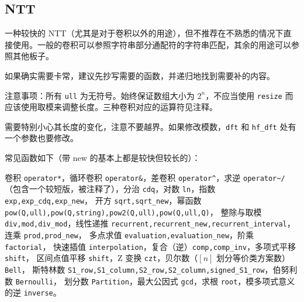 \documentclass[12pt]{ctexart}
\begin{document}
\subsection{NTT}

一种较快的 NTT（尤其是对于卷积以外的用途），但不推荐在不熟悉的情况下直接使用。一般的卷积可以参照字符串部分通配符的字符串匹配，其余的用途可以参照其他板子。

如果确实需要卡常，建议先抄写需要的函数，并递归地找到需要补的内容。

注意事项：所有 \verb|ull| 为无符号。始终保证数组大小为 $2^n$，不应当使用 \verb|resize| 而应该使用取模来调整长度。三种卷积对应的运算符见注释。

需要特别小心其长度的变化，注意不要越界。如果修改模数，\verb|dft| 和 \verb|hf_dft| 处有一个参数也要修改。

常见函数如下（带 new 的基本上都是较快但较长的）：

卷积 \verb|operator*|，循环卷积 \verb|operator&|，差卷积 \verb|operator^|，求逆 \verb|operator~/|
（包含一个较短版，被注释了），分治 \verb|cdq|，对数 \verb|ln|，指数 \verb|exp,exp_cdq,exp_new|，
开方 \verb|sqrt,sqrt_new|，幂函数 \verb|pow(Q,ull),pow(Q,string),pow2(Q,ull),pow(Q,ull,Q)|，
整除与取模 \verb|div,mod,div_mod|，线性递推 \verb|recurrent,recurrent_new,recurrent_interval|，
连乘 \verb|prod,prod_new|，\newline
多点求值 \verb|evaluation,evaluation_new|，阶乘 \verb|factorial|，
快速插值 \verb|interpolation|，复合（逆）\verb|comp,comp_inv|，多项式平移 \verb|shift|，
区间点值平移 \verb|shift|，Z 变换 \verb|czt|，贝尔数（$[n]$ 划分等价类方案数）\verb|Bell|，
斯特林数 \verb|S1_row,S1_column,S2_row,S2_column,signed_S1_row|，伯努利数 \verb|Bernoulli|，
划分数 \verb|Partition|，最大公因式 \verb|gcd|，求根 \verb|root|，模多项式意义的逆 \verb|inverse|。
\end{document}
